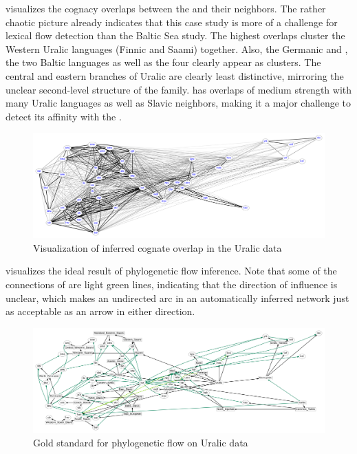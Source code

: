  visualizes the cognacy overlaps between the  and their neighbors. The rather chaotic picture already indicates that this case study is more of a challenge for lexical flow detection than the Baltic Sea study. The highest overlaps cluster the Western Uralic languages (Finnic and Saami) together. Also, the Germanic and , the two Baltic languages as well as the four  clearly appear as clusters. The central and eastern branches of Uralic are clearly least distinctive, mirroring the unclear second-level structure of the family.  has overlaps of medium strength with many Uralic languages as well as Slavic neighbors, making it a major challenge to detect its affinity with the .

\begin{figure}
\includegraphics[width=\textwidth]{figures/cognacy-strength-uralic.pdf}
\caption{Visualization of inferred cognate overlap in the Uralic data}
\label{uralic-cognacy}
\end{figure}

 visualizes the ideal result of phylogenetic flow inference. Note that some of the connections of  are light green lines, indicating that the direction of influence is unclear, which makes an undirected arc in an automatically inferred network just as acceptable as an arrow in either direction.

\begin{figure}
\includegraphics[width=\textwidth]{figures/goldstandard-phylo-uralic.pdf}
\caption{Gold standard for phylogenetic flow on Uralic data}
\label{uralic-goldstandard-phylo}
\end{figure}

